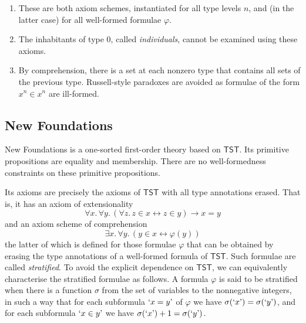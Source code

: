 \begin{remarks}\mbox{\negthinspace}
	\begin{enumerate}
		\item These are both axiom schemes, instantiated for all type levels \( n \), and (in the latter case) for all well-formed formulae \( \varphi \).
		\item The inhabitants of type 0, called \emph{individuals}, cannot be examined using these axioms.
		\item By comprehension, there is a set at each nonzero type that contains all sets of the previous type.
		Russell-style paradoxes are avoided as formulae of the form \( x^n \in x^n \) are ill-formed.
	\end{enumerate}
\end{remarks}

\subsection{New Foundations}

New Foundations is a one-sorted first-order theory based on \( \mathsf{TST} \).
Its primitive propositions are equality and membership.
There are no well-formedness constraints on these primitive propositions.

Its axioms are precisely the axioms of \( \mathsf{TST} \) with all type annotations erased.
That is, it has an axiom of extensionality
\[ \forall x.\, \forall y.\, (\forall z.\, z \in x \leftrightarrow z \in y) \to x = y \]
and an axiom scheme of comprehension
\[ \exists x.\, \forall y.\, (y \in x \leftrightarrow \varphi(y)) \]
the latter of which is defined for those formulae \( \varphi \) that can be obtained by erasing the type annotations of a well-formed formula of \( \mathsf{TST} \).
Such formulae are called \emph{stratified}.
To avoid the explicit dependence on \( \mathsf{TST} \), we can equivalently characterise the stratified formulae as follows.
A formula \( \varphi \) is said to be stratified when there is a function \( \sigma \) from the set of variables to the nonnegative integers, in such a way that for each subformula \( \text{`}x = y\text{'} \) of \( \varphi \) we have \( \sigma(\text{`}x\text{'}) = \sigma(\text{`}y\text{'}) \), and for each subformula \( \text{`}x \in y\text{'} \) we have \( \sigma(\text{`}x\text{'}) + 1 = \sigma(\text{`}y\text{'}) \).

